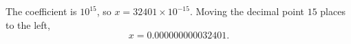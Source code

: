 The coefficient is $10^{15}$, so $x=32401\times10^{-15}$. Moving the decimal point $15$ places to the left,
\[x=\boxed{0.000000000032401}.\]
